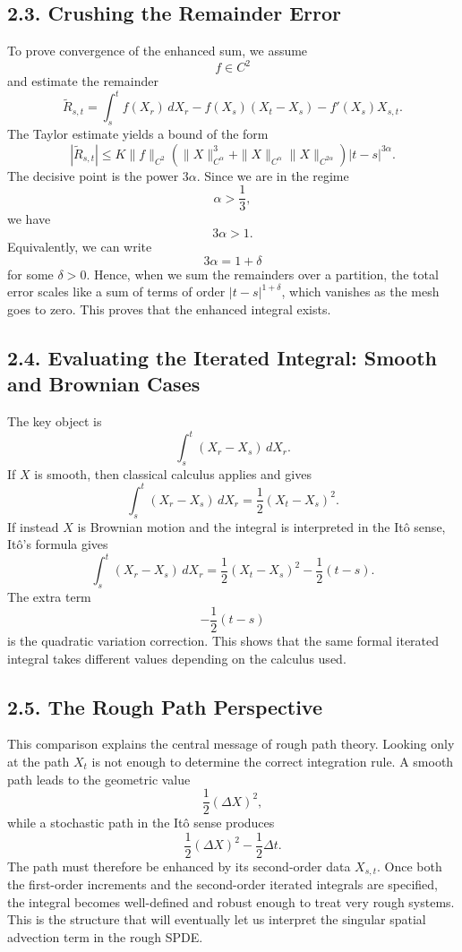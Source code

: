 \documentclass[11pt]{article}
\theoremstyle{definition}
\theoremstyle{remark}
\begin{document}
\subsection*{2.3. Crushing the Remainder Error}
To prove convergence of the enhanced sum, we assume
\[
f\in C^2
\]
and estimate the remainder
\[
\widetilde R_{s,t}
=
\int_s^t f(X_r)\,dX_r
-f(X_s)(X_t-X_s)
-f'(X_s)X_{s,t}.
\]
The Taylor estimate yields a bound of the form
\[
|\widetilde R_{s,t}|
\le
K\|f\|_{C^2}
\left(
\|X\|_{C^\alpha}^3
+
\|X\|_{C^\alpha}\|X\|_{C^{2\alpha}}
\right)
|t-s|^{3\alpha}.
\]
The decisive point is the power \(3\alpha\). Since we are in the regime
\[
\alpha>\frac13,
\]
we have
\[
3\alpha>1.
\]
Equivalently, we can write
\[
3\alpha=1+\delta
\]
for some \(\delta>0\). Hence, when we sum the remainders over a partition, the total error scales like a sum of terms of order \(|t-s|^{1+\delta}\), which vanishes as the mesh goes to zero. This proves that the enhanced integral exists.

\subsection*{2.4. Evaluating the Iterated Integral: Smooth and Brownian Cases}
The key object is
\[
\int_s^t (X_r-X_s)\,dX_r.
\]
If \(X\) is smooth, then classical calculus applies and gives
\[
\int_s^t (X_r-X_s)\,dX_r
=
\frac12 (X_t-X_s)^2.
\]
If instead \(X\) is Brownian motion and the integral is interpreted in the It\^o sense, It\^o's formula gives
\[
\int_s^t (X_r-X_s)\,dX_r
=
\frac12 (X_t-X_s)^2-\frac12 (t-s).
\]
The extra term
\[
-\frac12 (t-s)
\]
is the quadratic variation correction. This shows that the same formal iterated integral takes different values depending on the calculus used.

\subsection*{2.5. The Rough Path Perspective}
This comparison explains the central message of rough path theory. Looking only at the path \(X_t\) is not enough to determine the correct integration rule. A smooth path leads to the geometric value
\[
\frac12(\Delta X)^2,
\]
while a stochastic path in the It\^o sense produces
\[
\frac12(\Delta X)^2-\frac12\Delta t.
\]
The path must therefore be enhanced by its second-order data \(X_{s,t}\). Once both the first-order increments and the second-order iterated integrals are specified, the integral becomes well-defined and robust enough to treat very rough systems. This is the structure that will eventually let us interpret the singular spatial advection term in the rough SPDE.
\end{document}
